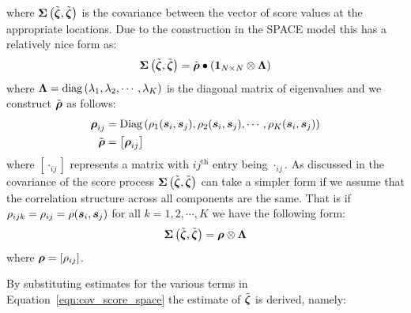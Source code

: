 where $ \bm{{\Sigma}}\left(\tilde{\bm{{\zeta}}}, \tilde{\bm{{\zeta}}}\right)$ is the covariance between the vector of score values at the appropriate locations. Due to the construction in the SPACE model this has a relatively nice form as:
\begin{equation}
	 \bm{{\Sigma}}\left(\tilde{\bm{{\zeta}}}, \tilde{\bm{{\zeta}}}\right) = \tilde{\bm{{\rho}}} \bullet \left(\bm{{1}}_{N \times N} \otimes \bm{{\Lambda}} \right)
	 \label{eqn:cov_score_space}
\end{equation}
where $\bm{{\Lambda}} = \text{diag}\left(\lambda_1, \lambda_2, \cdots, \lambda_K\right)$ is the diagonal matrix of eigenvalues and we construct $\tilde{\bm{{\rho}}}$ as follows: 
\begin{align}
	\bm{{\rho}}_{ij} &= \text{Diag} \left( \rho_1(\bm{{s}}_{i}, \bm{{s}}_{j}), \rho_2(\bm{{s}}_{i}, \bm{{s}}_{j}), \cdots, \rho_K(\bm{{s}}_{i}, \bm{{s}}_{j}) \right) \\
	\tilde{\bm{{\rho}}} &= \left[\bm{{\rho}}_{ij}\right]
\end{align}
where $\left[\cdot_{ij}\right]$ represents a matrix with ${ij}^\text{th}$ entry being $\cdot_{ij}$.
As discussed in \citep{liu_functional_2017} the covariance of the score process $\bm{{\Sigma}}\left(\tilde{\bm{{\zeta}}}, \tilde{\bm{{\zeta}}}\right)$ can take a simpler form if we assume that the correlation structure across all components are the same. 
That is if $\rho_{ijk} = \rho_{ij} = \rho(\bm{{s}}_{i}, \bm{{s}}_{j}) $ for all $k=1, 2, \cdots, K$ we have the following form:
\begin{equation}
	\bm{{\Sigma}}\left(\tilde{\bm{{\zeta}}}, \tilde{\bm{{\zeta}}}\right) = \bm{{\rho}} \otimes \bm{{\Lambda}}
	\label{eqn:cov_score_space_separable}
\end{equation}
where $\bm{{\rho}} = \left[\rho_{ij}\right]$. 

By substituting estimates for the various terms in Equation~\ref{eqn:cov_score_space} the estimate of $\tilde{\bm{{\zeta}}}$ is derived, namely: 

